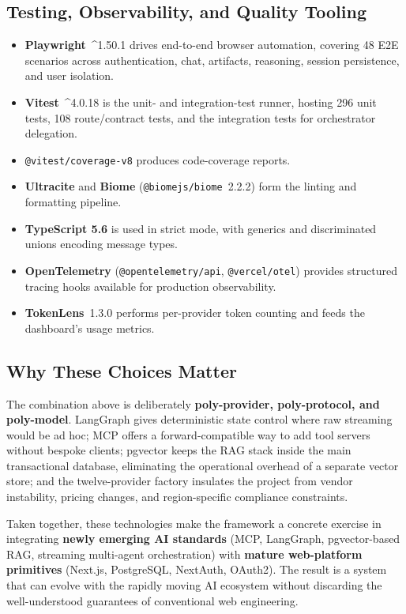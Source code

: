 \documentclass[11pt,a4paper]{report}
\newcommand{\code}[1]{\texttt{\small #1}}
\begin{document}
\subsection{Testing, Observability, and Quality Tooling}

\begin{itemize}
  \item \textbf{Playwright}\ \^{}1.50.1 drives end-to-end browser automation, covering 48 E2E scenarios across authentication, chat, artifacts, reasoning, session persistence, and user isolation.
  \item \textbf{Vitest}\ \^{}4.0.18 is the unit- and integration-test runner, hosting 296 unit tests, 108 route/contract tests, and the integration tests for orchestrator delegation.
  \item \code{@vitest/coverage-v8} produces code-coverage reports.
  \item \textbf{Ultracite} and \textbf{Biome} (\code{@biomejs/biome}\ 2.2.2) form the linting and formatting pipeline.
  \item \textbf{TypeScript 5.6} is used in strict mode, with generics and discriminated unions encoding message types.
  \item \textbf{OpenTelemetry} (\code{@opentelemetry/api}, \code{@vercel/otel}) provides structured tracing hooks available for production observability.
  \item \textbf{TokenLens}\ 1.3.0 performs per-provider token counting and feeds the dashboard's usage metrics.
\end{itemize}

\subsection{Why These Choices Matter}

The combination above is deliberately \textbf{poly-provider, poly-protocol,
and poly-model}. LangGraph gives deterministic state control where raw
streaming would be ad hoc; MCP offers a forward-compatible way to add tool
servers without bespoke clients; pgvector keeps the RAG stack inside the main
transactional database, eliminating the operational overhead of a separate
vector store; and the twelve-provider factory insulates the project from
vendor instability, pricing changes, and region-specific compliance
constraints.

Taken together, these technologies make the framework a concrete exercise in
integrating \textbf{newly emerging AI standards} (MCP, LangGraph,
pgvector-based RAG, streaming multi-agent orchestration) with \textbf{mature
web-platform primitives} (Next.js, PostgreSQL, NextAuth, OAuth2). The result
is a system that can evolve with the rapidly moving AI ecosystem without
discarding the well-understood guarantees of conventional web engineering.
\end{document}

